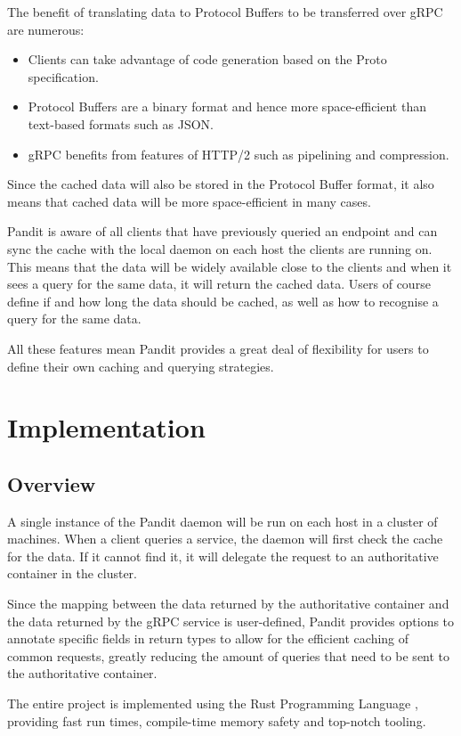 \documentclass[a4paper]{article}
\begin{document}
The benefit of translating data to Protocol Buffers to be transferred over gRPC are numerous:
\begin{itemize}
    \item Clients can take advantage of code generation based on the Proto specification. \cite{codegen}
    \item Protocol Buffers are a binary format and hence more space-efficient than text-based formats such as JSON. \cite{encoding}
    \item gRPC benefits from features of HTTP/2 such as pipelining and compression. \cite{http2}
\end{itemize}

Since the cached data will also be stored in the Protocol Buffer format, it also means that cached data will be more space-efficient in
many cases.

Pandit is aware of all clients that have previously queried an endpoint and can sync the cache with the local daemon on each host the
clients are running on.
This means that the data will be widely available close to the clients and when it sees a query for the same data, it will return the cached data.
Users of course define if and how long the data should be cached, as well as how to recognise a query for the same data.

All these features mean Pandit provides a great deal of flexibility for users to define their own caching and querying strategies.

\section{Implementation}
\subsection{Overview}
A single instance of the Pandit daemon will be run on each host in a cluster of machines. When a client queries
a service, the daemon will first check the cache for the data. If it cannot find it, it will delegate the request
to an authoritative container in the cluster.

Since the mapping between the data returned by the authoritative container and the data returned by the gRPC service is
user-defined, Pandit provides options to annotate specific fields in return types to allow for the efficient caching of
common requests, greatly reducing the amount of queries that need to be sent to the authoritative container.

The entire project is implemented using the Rust Programming Language \cite{rust}, providing fast run times, compile-time memory safety
and top-notch tooling.
\end{document}

